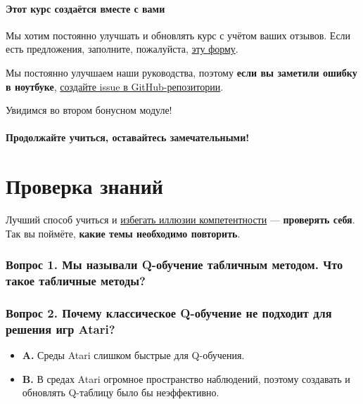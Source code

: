 \documentclass[11pt,a4paper]{article}
\begin{document}
\paragraph{Этот курс создаётся вместе с вами}\label{this-is-a-course-built-with-you}

Мы хотим постоянно улучшать и обновлять курс с учётом ваших отзывов. Если есть предложения, заполните, пожалуйста, \href{https://forms.gle/3HgA7bEHwAmmLfwh9}{эту форму}.

Мы постоянно улучшаем наши руководства, поэтому \textbf{если вы заметили ошибку в ноутбуке}, \href{https://github.com/huggingface/deep-rl-class/issues}{создайте issue в GitHub-репозитории}.

Увидимся во втором бонусном модуле!

\paragraph{Продолжайте учиться, оставайтесь замечательными!}\label{keep-learning-stay-awesome}

\section{Проверка знаний}\label{quiz}

Лучший способ учиться и \href{https://www.coursera.org/lecture/learning-how-to-learn/illusions-of-competence-BuFzf}{избегать иллюзии компетентности} --- \textbf{проверять себя}. Так вы поймёте, \textbf{какие темы необходимо повторить}.

\subsubsection{Вопрос 1. Мы называли Q-обучение табличным методом. Что такое табличные методы?}\label{q1-we-mentioned-q-learning-is-a-tabular-method.-what-are-tabular-methods}

\subsubsection{Вопрос 2. Почему классическое Q-обучение не подходит для решения игр Atari?}\label{q2-why-cant-we-use-a-classical-q-learning-to-solve-an-atari-game}

\begin{itemize}
\tightlist
\item
\textbf{A.} Среды Atari слишком быстрые для Q-обучения.
\item
\textbf{B.} В средах Atari огромное пространство наблюдений, поэтому создавать и обновлять Q-таблицу было бы неэффективно.
\end{itemize}
\end{document}
